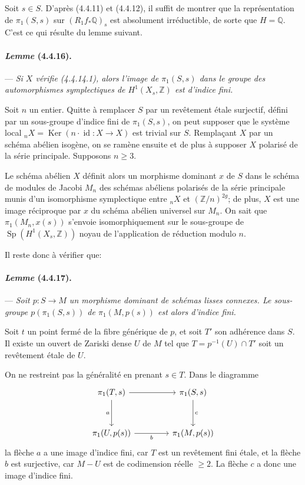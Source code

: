 \documentclass[10pt]{article}
\newcommand{\Q}{\mathbb Q}
\newcommand{\Z}{\mathbb Z}
\newcommand{\Ker}{\operatorname{Ker}}
\newcommand{\fg}{\guillemotright}
\newcommand{\og}{\guillemotleft}
\providecommand{\Sp}{\operatorname{Sp}}
\begin{document}
Soit $s\in S$. D'après (4.4.11) et (4.4.12), il suffit de montrer que la représentation de $\pi_1(S,s)$ sur $(R_1f_*\Q)_s$ est absolument irréductible, de sorte que $H=\Q$. C'est ce qui résulte du lemme suivant.

\paragraph{\emph{Lemme} (4.4.16).} --- {\itshape Si $X$ vérifie (4.4.14.1), alors l'image de $\pi_1(S,s)$ dans le groupe des automorphismes symplectiques de $H^1(X_s,\Z)$ est d'indice fini.}

Soit $n$ un entier. Quitte à remplacer $S$ par un revêtement étale surjectif, défini par un sous-groupe d'indice fini de $\pi_1(S,s)$, on peut supposer que le système local ${}_nX=\Ker(n\cdot \operatorname{id}:X\to X)$ est trivial sur $S$. Remplaçant $X$ par un schéma abélien isogène, on se ramène ensuite et de plus à supposer $X$ polarisé de la série principale. Supposons $n\ge3$.

Le schéma abélien $X$ définit alors un morphisme dominant $x$ de $S$ dans le schéma de modules \og de Jacobi\fg{} $M_n$ des schémas abéliens polarisés de la série principale munis d'un isomorphisme symplectique entre ${}_nX$ et $(\Z/n)^{2g}$; de plus, $X$ est une image réciproque par $x$ du schéma abélien universel sur $M_n$. On sait que $\pi_1(M_n,x(s))$ s'envoie isomorphiquement
sur le sous-groupe de $\Sp(H^1(X_s,\Z))$ noyau de l'application de réduction modulo $n$.

Il reste donc à vérifier que:

\paragraph{\emph{Lemme} (4.4.17).} --- {\itshape Soit $p:S\to M$ un morphisme dominant de schémas lisses connexes. Le sous-groupe $p(\pi_1(S,s))$ de $\pi_1(M,p(s))$ est alors d'indice fini.}

Soit $t$ un point fermé de la fibre générique de $p$, et soit $T'$ son adhérence dans $S$. Il existe un ouvert de Zariski dense $U$ de $M$ tel que $T=p^{-1}(U)\cap T'$ soit un revêtement étale de $U$.

On ne restreint pas la généralité en prenant $s\in T$. Dans le diagramme
\[
\begin{tikzcd}[column sep=4.2em,row sep=3.2em]
\pi_1(T,s) \arrow[r] \arrow[d,"a"'] & \pi_1(S,s) \arrow[d,"c"]\\
\pi_1(U,p(s)) \arrow[r,"b"'] & \pi_1(M,p(s))
\end{tikzcd}
\]
la flèche $a$ a une image d'indice fini, car $T$ est un revêtement fini étale, et la flèche $b$ est surjective, car $M-U$ est de codimension réelle $\ge2$. La flèche $c$ a donc une image d'indice fini.
\end{document}
